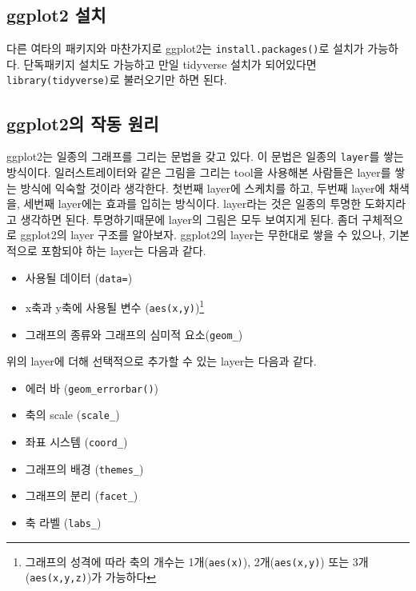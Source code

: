 \documentclass[
]{book}
\providecommand{\tightlist}{%
  \setlength{\itemsep}{0pt}\setlength{\parskip}{0pt}}
\theoremstyle{definition}
\theoremstyle{definition}
\theoremstyle{definition}
\theoremstyle{definition}
\theoremstyle{remark}
\begin{document}
\hypertarget{ggplot2-uxc124uxce58}{%
\subsection{ggplot2 설치}\label{ggplot2-uxc124uxce58}}

다른 여타의 패키지와 마찬가지로 ggplot2는 \texttt{install.packages()}로 설치가 가능하다. 단독패키지 설치도 가능하고 만일 tidyverse 설치가 되어있다면
\texttt{library(tidyverse)}로 불러오기만 하면 된다.

\hypertarget{ggplot2uxc758-uxc791uxb3d9-uxc6d0uxb9ac}{%
\subsection{ggplot2의 작동 원리}\label{ggplot2uxc758-uxc791uxb3d9-uxc6d0uxb9ac}}

ggplot2는 일종의 그래프를 그리는 문법을 갖고 있다. 이 문법은 일종의 \texttt{layer}를 쌓는 방식이다. 일러스트레이터와 같은 그림을 그리는 tool을 사용해본 사람들은 layer를 쌓는 방식에 익숙할 것이라 생각한다. 첫번째 layer에 스케치를 하고, 두번째 layer에 채색을, 세번째 layer에는 효과를 입히는 방식이다. layer라는 것은 일종의 투명한 도화지라고 생각하면 된다. 투명하기때문에 layer의 그림은 모두 보여지게 된다.
좀더 구체적으로 ggplot2의 layer 구조를 알아보자. ggplot2의 layer는 무한대로 쌓을 수 있으나, 기본적으로 포함되야 하는 layer는 다음과 같다.

\begin{itemize}
\tightlist
\item
  사용될 데이터 (\texttt{data=})
\item
  x축과 y축에 사용될 변수 (\texttt{aes(x,y)})\footnote{그래프의 성격에 따라 축의 개수는 1개(\texttt{aes(x)}), 2개(\texttt{aes(x,y)}) 또는 3개(\texttt{aes(x,y,z)})가 가능하다}
\item
  그래프의 종류와 그래프의 심미적 요소(\texttt{geom\_})
\end{itemize}

위의 layer에 더해 선택적으로 추가할 수 있는 layer는 다음과 같다.

\begin{itemize}
\tightlist
\item
  에러 바 (\texttt{geom\_errorbar()})
\item
  축의 scale (\texttt{scale\_})
\item
  좌표 시스템 (\texttt{coord\_})
\item
  그래프의 배경 (\texttt{themes\_})
\item
  그래프의 분리 (\texttt{facet\_})
\item
  축 라벨 (\texttt{labs\_})
\end{itemize}
\end{document}
